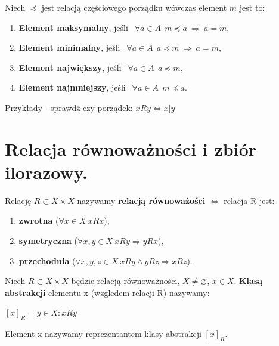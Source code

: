 \documentclass[12pt]{article}
\begin{document}
    \begin{definition}
        Niech $\preceq$ jest relacją częściowego porządku wówczas element $m$ jest to:
        \begin{enumerate}
            \item \textbf{Element maksymalny}, jeśli $~~ \forall a \in A ~~ m \preceq a ~ \Rightarrow  ~ a = m$,
            \item \textbf{Element minimalny}, jeśli $~~ \forall a \in A ~~ a \preceq m ~ \Rightarrow  ~ a = m$,
            \item \textbf{Element największy}, jeśli $~~ \forall a \in A ~~ a \preceq m$,
            \item \textbf{Element najmniejszy}, jeśli $~~ \forall a \in A ~~ m \preceq a$.
        \end{enumerate}
    \end{definition}

    Przykłady - sprawdź czy porządek: $xRy \Leftrightarrow x | y$


    \newpage

    \section{Relacja równoważności i zbiór ilorazowy.}

    \begin{definition}
        Relację $R \subset X \times X$ nazywamy \textbf{relacją równoważości} $\Leftrightarrow$ relacja R jest:
        \begin{enumerate}
            \item \textbf{zwrotna} ($\forall x \in X ~ xRx $),
            \item \textbf{symetryczna} ($\forall x,y \in X ~ xRy \Rightarrow yRx$),
            \item \textbf{przechodnia} ($\forall x,y,z \in X ~ xRy \wedge yRz \Rightarrow xRz$).
        \end{enumerate}
    \end{definition}

    \begin{definition}
        Niech $R \subset X \times X$ będzie relacją równoważności, $X \neq \varnothing$, $x \in X$. \textbf{Klasą abstrakcji}
        elementu x (wzgledem relacji R) nazywamy:

        $[x]_{R} = {y \in X: xRy}$

        Element x nazywamy reprezentantem klasy abstrakcji $[x]_{R}$.
    \end{definition}
\end{document}
